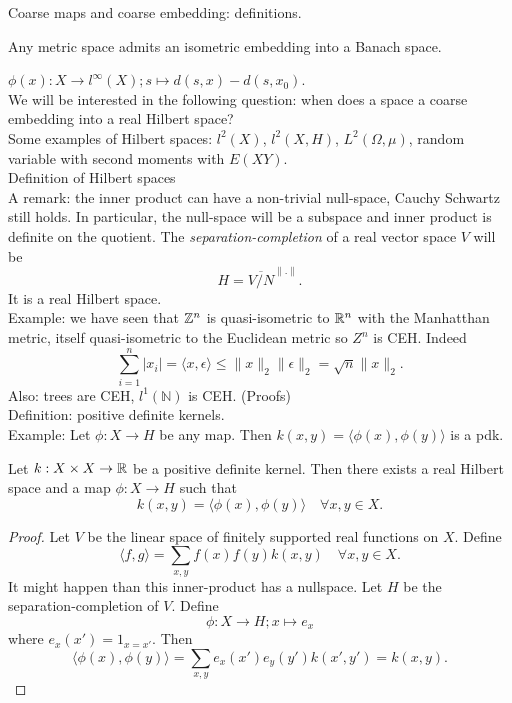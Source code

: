 Coarse maps and coarse embedding: definitions.\\

\begin{prop}
Any metric space admits an isometric embedding into a Banach space.
\end{prop}

$\phi(x) : X\rightarrow l^\infty (X) ;  s \mapsto d(s,x) - d(s,x_0)$.\\

We will be interested in the following question: when does a space a coarse embedding into a real Hilbert space?\\

Some examples of Hilbert spaces: $l^2(X)$, $l^2(X,H)$, $L^2(\Omega, \mu)$, random variable with second moments with $E(XY)$.\\

Definition of Hilbert spaces\\

A remark: the inner product can have a non-trivial null-space, Cauchy Schwartz still holds. In particular, the null-space will be a subspace and inner product is definite on the quotient. The \textit{separation-completion} of a real vector space $V$ will be 
\[H = \overline{V /N }^{\| .\|}.\]
It is a real Hilbert space.\\
 
Example: we have seen that $\mathbb Z^n$ is quasi-isometric to $\mathbb R^n$ with the Manhatthan metric, itself quasi-isometric to the Euclidean metric so $Z^n$ is CEH. Indeed
\[\sum_{i=1}^n |x_i | = \langle x,\epsilon\rangle \leq \| x\|_2 \|\epsilon \|_2 = \sqrt{n} \| x\|_2 .\]
Also: trees are CEH, $l^1(\mathbb N)$ is CEH. (Proofs)\\

Definition: positive definite kernels.\\

Example: Let $\phi: X\rightarrow H$ be any map. Then $k(x,y) = \langle \phi(x) , \phi(y)\rangle $ is a pdk.

\begin{thm}
Let $k: X\times X \rightarrow \mathbb R$ be a positive definite kernel. Then there exists a real Hilbert space and a map $\phi: X \rightarrow H$ such that 
\[k(x,y) = \langle \phi(x) , \phi(y)\rangle  \quad \forall x,y \in X.\]
\end{thm}

\begin{proof}
Let $V$ be the linear space of finitely supported real functions on $X$. Define
\[ \langle f , g \rangle = \sum_{x,y} f(x)f(y) k(x,y) \quad \forall x,y\in X.\]
It might happen than this inner-product has a nullspace. Let $H$ be the separation-completion of $V$.
Define \[\phi : X\rightarrow H ; x \mapsto e_x\]
where $e_x(x') = 1_{x=x'}$. Then
\[ \langle \phi(x) , \phi(y)\rangle = \sum_{x,y} e_x(x')e_y(y') k(x',y') = k(x,y). \] 
\end{proof}

